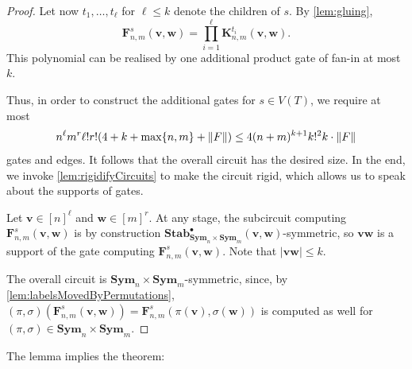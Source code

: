 \documentclass[11pt, DIV=15]{scrarticle}
\theoremstyle{definition}
\theoremstyle{plain}
\theoremstyle{remark}
\DeclarePairedDelimiter{\norm}{\lVert}{\rVert}
\newcommand{\Sym}{\mathbf{Sym}}
\newcommand{\Stab}{\mathbf{Stab}}
\newcommand{\StabP}{\Stab^{\bullet}}
\begin{document}
\begin{proof}
 		Let now $t_1, \dots, t_\ell$ for $\ell \leq k$ denote the children of $s$.
 		By \cref{lem:gluing},
 		\begin{equation}\label{eq:circuit3}
 			\boldsymbol{F}^s_{n,m}(\boldsymbol{v},\boldsymbol{w}) = \prod_{i=1}^\ell \boldsymbol{K}^{t_i}_{n,m}(\boldsymbol{v}, \boldsymbol{w}).
 		\end{equation}
 		This polynomial can be realised by one additional product gate of fan-in at most $k$.
 		
 		Thus, in order to construct the additional gates for $s \in V(T)$, 
 		we require at most \[ n^\ell m^r \ell! r! (4 + k  + \max\{n,m\} + \norm{F})  \leq 4(n+m)^{k+1} k!^2 k \cdot \norm{F} \] gates and edges.
 		It follows that the overall circuit has the desired size. In the end, we invoke \cref{lem:rigidifyCircuits} to make the circuit rigid, which allows us to speak about the supports of gates.
 		
 		Let $\boldsymbol{v} \in [n]^\ell$ and $\boldsymbol{w} \in [m]^r$.
 		At any stage, the subcircuit computing $\boldsymbol{F}^s_{n,m}(\boldsymbol{v}, \boldsymbol{w})$ is by construction $\StabP_{\Sym_n \times \Sym_m}(\boldsymbol{v}, \boldsymbol{w})$-symmetric, so $\boldsymbol{v}\boldsymbol{w}$ is a support of the gate computing $\boldsymbol{F}^s_{n,m}(\boldsymbol{v}, \boldsymbol{w})$. Note that $|\boldsymbol{v}\boldsymbol{w}| \leq k$.
 		
 		The overall circuit is $\Sym_n \times \Sym_m$-symmetric,
 		since, by \cref{lem:labelsMovedByPermutations}, $(\pi, \sigma)(\boldsymbol{F}^s_{n,m}(\boldsymbol{v}, \boldsymbol{w})) = \boldsymbol{F}^s_{n,m}(\pi(\boldsymbol{v}), \sigma(\boldsymbol{w}))$ is computed as well for $(\pi, \sigma) \in \Sym_n \times \Sym_m$.
 	\end{proof}
 	
 	The lemma implies the theorem:
 	
\end{document}
